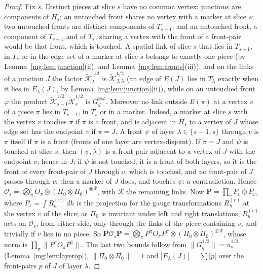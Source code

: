 \documentclass[11pt,a4paper]{article}
\theoremstyle{definition}
\theoremstyle{remark}
\newcommand{\norm}[1]{\lVert #1\rVert}
\begin{document}
\begin{proof}
Fix $s$. Distinct pieces at slice $s$ have no common vertex: junctions are components of $H_s$; an untouched front shares no vertex with a marker
at slice $s$; two untouched fronts are distinct components of $T_{s-1}$; and an untouched front, a component of $T_{s-1}$ and of $T_s$, sharing a
vertex with the front of a front-pair would be that front, which is touched. A spatial link of slice $s$ that lies in $T_{s-1}$, in $T_s$ or in the edge set of a marker at slice $s$ belongs to exactly one piece (by
Lemma~\ref{mg:lem:junction}(ii), and Lemma~\ref{mg:lem:fronts}(iii)), and on the links of a junction $J$ the factor $\tilde{\mathcal K}_\lambda^{1/2}$ is
$\tilde{\mathcal K}^{1/2}_{J,\lambda}$ (an edge of $E(J)$ lies in $T_\lambda$ exactly when it lies in $E_\lambda(J)$, by Lemma~\ref{mg:lem:junction}(ii)), while on an untouched front
$\varphi$ the product $\tilde{\mathcal K}_{s-1}^{1/2}\tilde{\mathcal K}_s^{1/2}$ is $G_g^{\otimes\varphi}$. Moreover no link outside $E(\pi)$ at a vertex $v$
of a piece $\pi$ lies in $T_{s-1}$, in $T_s$ or in a marker. Indeed, a marker at slice $s$ with the vertex $v$ touches $\pi$ if $\pi$ is a front, and
is adjacent in $H_s$ to a vertex of $J$ whose edge set has the endpoint $v$ if $\pi=J$. A front $\psi$ of layer $\lambda\in\{s-1,s\}$ through $v$ is $\pi$
itself if $\pi$ is a front (fronts of one layer are vertex-disjoint). If $\pi=J$ and $\psi$ is touched at slice $s$, then $(\psi,\lambda)$ is a front-pair
adjacent to a vertex of $J$ with the endpoint $v$, hence in $J$; if $\psi$ is not touched, it is a front of both layers, so it is the front of every
front-pair of $J$ through $v$, which is touched, and no front-pair of $J$ passes through $v$; then a marker of $J$ does, and touches $\psi$: a contradiction.
Hence $\mathcal O_s=\bigotimes_\pi O_\pi\otimes(\Pi_0\otimes\Pi_0)^{\otimes\mathcal R}$, with $\mathcal R$ the remaining links. Now $\mathbf P=\prod_v
P_v\otimes P_v$, where $P_v=\int R^{(v)}_h\,dh$ is the projection for the gauge transformations $R^{(v)}_h$ at the vertex $v$ of the slice; as $\Pi_0$ is
invariant under left and right translations, $R^{(v)}_h$ acts on $\mathcal O_s$, from either side, only through the links of the piece containing $v$,
and trivially if $v$ lies in no piece. So $\mathbf P\mathcal O_s\mathbf P=\bigotimes_\pi P^\pi O_\pi P^\pi\otimes(\Pi_0\otimes\Pi_0)^{\otimes\mathcal R}$,
whose norm is $\prod_\pi\norm{P^\pi O_\pi P^\pi}$. The last two bounds follow from $\norm{G_g^{1/2}}=u_*^{1/2}$ (Lemma~\ref{mg:lem:layerop}),
$\norm{\Pi_0\otimes\Pi_0}=1$ and $|E_\lambda(J)|=\sum|p|$ over the front-pairs $p$ of $J$ of layer $\lambda$.
\end{proof}
\end{document}
